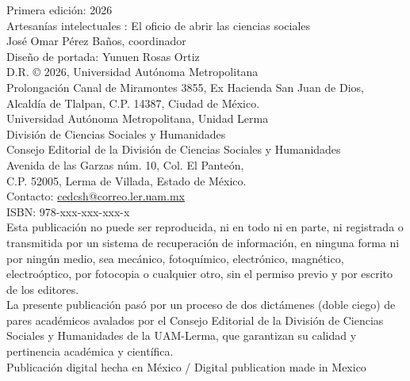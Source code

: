 \begingroup
\begin{singlespace}
\scriptsize
\noindent
Primera edición: 2026\\
Artesanías intelectuales : El oficio de abrir las ciencias sociales\\
José Omar Pérez Baños, coordinador\\[0.5em]
Diseño de portada: Yunuen Rosas Ortiz\\[0.5em]
D.R. © 2026, Universidad Autónoma Metropolitana\\
Prolongación Canal de Miramontes 3855, Ex Hacienda San Juan de Dios,\\
Alcaldía de Tlalpan, C.P. 14387, Ciudad de México.\\[0.5em]
{\scriptsize Universidad Autónoma Metropolitana, Unidad Lerma}\\
División de Ciencias Sociales y Humanidades\\
Consejo Editorial de la División de Ciencias Sociales y Humanidades\\
Avenida de las Garzas núm. 10, Col. El Panteón,\\
C.P. 52005, Lerma de Villada, Estado de México.\\
Contacto: \href{mailto:cedcsh@correo.ler.uam.mx}{cedcsh@correo.ler.uam.mx}\\[0.8em]
ISBN: 978-xxx-xxx-xxx-x\\[0.8em]
Esta publicación no puede ser reproducida, ni en todo ni en parte, ni registrada o transmitida por un sistema de recuperación de información, en ninguna forma ni por ningún medio, sea mecánico, fotoquímico, electrónico, magnético, electroóptico, por fotocopia o cualquier otro, sin el permiso previo y por escrito de los editores.\\[0.5em]
La presente publicación pasó por un proceso de dos dictámenes (doble ciego) de pares académicos avalados por el Consejo Editorial de la División de Ciencias Sociales y Humanidades de la UAM-Lerma, que garantizan su calidad y pertinencia académica y científica.\\[0.5em]
Publicación digital hecha en México / Digital publication made in Mexico
\end{singlespace}
\endgroup
\clearpage

\clearpage
\thispagestyle{empty}
\null
